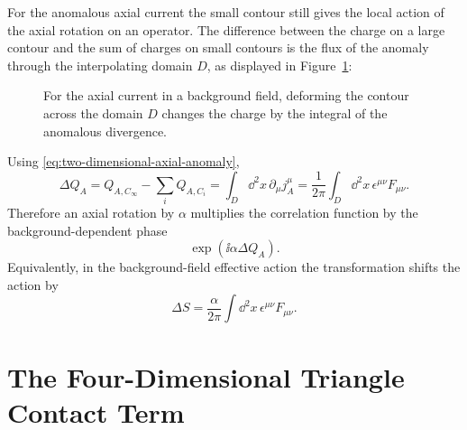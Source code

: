 For the anomalous axial current the small contour still gives the local action
of the axial rotation on an operator.  The difference between the charge on a
large contour and the sum of charges on small contours is the flux of the
anomaly through the interpolating domain \(D\), as displayed in
Figure~\ref{fig:anomalous-contour-charge-deformation}:
\begin{figure}[H]
  \centering
  \caption{For the axial current in a background field, deforming the contour
  across the domain \(D\) changes the charge by the integral of the anomalous
  divergence.}
  \label{fig:anomalous-contour-charge-deformation}
\end{figure}
Using \eqref{eq:two-dimensional-axial-anomaly},
\begin{equation}
  \Delta Q_A
  =
  Q_{A,C_\infty}-\sum_iQ_{A,C_i}
  =
  \int_D\dd^2x\,\partial_\mu j_A^\mu
  =
  \frac1{2\pi}\int_D\dd^2x\,
  \epsilon^{\mu\nu}F_{\mu\nu}.
  \label{eq:two-dimensional-anomalous-charge-shift}
\end{equation}
Therefore an axial rotation by \(\alpha\) multiplies the correlation function
by the background-dependent phase
\[
  \exp(\ii\alpha\Delta Q_A).
\]
Equivalently, in the background-field effective action the transformation
shifts the action by
\[
  \Delta S
  =
  \frac{\alpha}{2\pi}\int\dd^2x\,
  \epsilon^{\mu\nu}F_{\mu\nu}.
\]

\section{The Four-Dimensional Triangle Contact Term}

